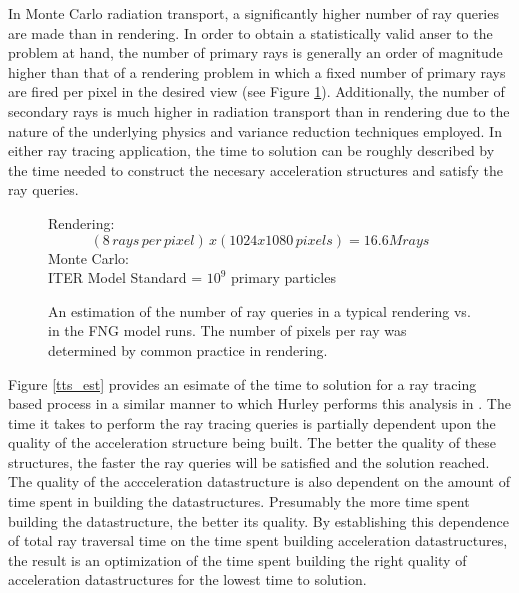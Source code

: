 \documentclass[12pt, a4paper]{article}
\begin{document}
In Monte Carlo radiation transport, a significantly higher number of ray queries are made than in rendering. In order to obtain a statistically valid anser to the problem at hand, the number of primary rays is generally an order of magnitude higher than that of a rendering problem in which a fixed number of primary rays are fired per pixel in the desired view (see Figure \ref{render_ray_estimate}). Additionally, the number of secondary rays is much higher in radiation transport than in rendering due to the nature of the underlying physics and variance reduction techniques employed. In either ray tracing application, the time to solution can be roughly described by the time needed to construct the necesary acceleration structures and satisfy the ray queries.

\begin{figure}[H]
  \centering
  Rendering:
  \[ (8\, rays\, per\, pixel)\, x (1024 x 1080\, pixels) = 16.6M rays \]
  Monte Carlo: \\
  ITER Model Standard = $10^{9}$ primary particles
  \caption{An  estimation of the number of ray queries in a typical rendering vs. in the FNG model runs. The number of pixels per ray was determined by common practice in rendering.}
  \label{render_ray_estimate}
\end{figure}

Figure \ref{tts_est} provides an esimate of the time to solution for a ray tracing based process in a similar manner to which Hurley performs this analysis in \cite{Hurley_2002}. The time it takes to perform the ray tracing queries is partially dependent upon the quality of the acceleration structure being built. The better the quality of these structures, the faster the ray queries will be satisfied and the solution reached. The quality of the accceleration datastructure is also dependent on the amount of time spent in building the datastructures. Presumably the more time spent building the datastructure, the better its quality. By establishing this dependence of total ray traversal time on the time spent building acceleration datastructures, the result is an optimization of the time spent building the right quality of acceleration datastructures for the lowest time to solution. 
\end{document}
